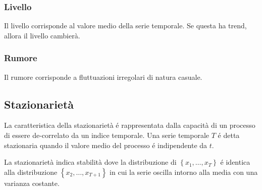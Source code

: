 \subsubsection{Livello}
Il livello corrisponde al valore medio della serie temporale. Se questa ha trend, allora il livello cambierà.

\subsubsection{Rumore}
Il rumore corrisponde a fluttuazioni irregolari di natura casuale.

\subsection{Stazionarietà}
La caratteristica della stazionarietà é rappresentata dalla capacità di un processo di essere de-correlato da un indice temporale. Una serie temporale $T$ é detta stazionaria quando il valore medio del processo é indipendente da $t$. 

La stazionarietà indica stabilità dove la distribuzione di $\left\{ x_1, \ldots, x_T  \right\}$ é identica alla distribuzione $\left\{ x_2, \ldots, x_{T+1}  \right\}$ in cui la serie oscilla intorno alla media con una varianza costante.